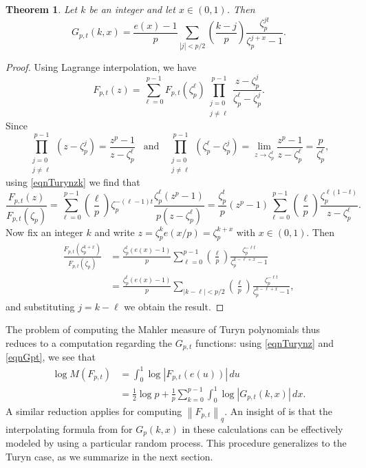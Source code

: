 \documentclass[reqno]{amsart}
\newtheorem{theorem}{Theorem}[section]
\numberwithin{equation}{section}
\numberwithin{table}{section}
\numberwithin{figure}{section}
\newcommand{\leg}[2]{\left(\frac{#1}{#2}\right)}
\newcommand{\abs}[1]{\left\lvert#1\right\rvert}
\newcommand{\dbars}[1]{\left\lVert#1\right\rVert}
\begin{document}
\begin{theorem}\label{thmAbsTuryn}
Let $k$ be an integer and let $x\in(0,1)$.
Then
\[
G_{p,t}(k,x) =
\frac{e(x)-1}{p}\sum_{\abs{j}<p/2} \leg{k-j}{p} \frac{\zeta_p^{jt}}{\zeta_p^{j+x}-1}.
\]
\end{theorem}

\begin{proof}
Using Lagrange interpolation, we have
\[
F_{p,t}(z) = \sum_{\ell=0}^{p-1} F_{p,t}(\zeta_p^\ell)
\prod_{\substack{j=0\\j\neq\ell}}^{p-1} \frac{z-\zeta_p^j}{\zeta_p^\ell-\zeta_p^j}.
\]
Since
\[
\prod_{\substack{j=0\\j\neq\ell}}^{p-1} (z-\zeta_p^j) = \frac{z^p-1}{z-\zeta_p^\ell}
\;\;\; \textrm{and} \;\;\;
\prod_{\substack{j=0\\j\neq\ell}}^{p-1} (\zeta_p^\ell-\zeta_p^j) =
\lim_{z\to\zeta_p^\ell} \frac{z^p-1}{z-\zeta_p^\ell} = \frac{p}{\zeta_p^{\ell}},
\]
using \eqref{eqnTurynzk} we find that
\[
\frac{F_{p,t}(z)}{F_{p,t}(\zeta_p)}
= \sum_{\ell=0}^{p-1} \leg{\ell}{p}\zeta_p^{-(\ell-1)t} \frac{\zeta_p^\ell(z^p-1)}{p(z-\zeta_p^\ell)}
= \frac{\zeta_p^t}{p}(z^p-1) \sum_{\ell=0}^{p-1} \leg{\ell}{p} \frac{\zeta_p^{\ell(1-t)}}{z-\zeta_p^\ell}.
\]
Now fix an integer $k$ and write $z=\zeta_p^k e(x/p)=\zeta_p^{k+x}$ with $x\in(0,1)$.
Then
\begin{align*}
\frac{F_{p,t}(\zeta_p^{k+x})}{F_{p,t}(\zeta_p)} &=
\frac{\zeta_p^t (e(x)-1)}{p}
\sum_{\ell=0}^{p-1} \leg{\ell}{p} \frac{\zeta_p^{-\ell t}}{\zeta_p^{k-\ell+x}-1}\\
&=
\frac{\zeta_p^t (e(x)-1)}{p} \sum_{\abs{k-\ell}<p/2} \leg{\ell}{p} \frac{\zeta_p^{-\ell t}}{\zeta_p^{k-\ell+x}-1},
\end{align*}
and substituting $j=k-\ell$ we obtain the result.
\end{proof}

The problem of computing the Mahler measure of Turyn polynomials thus reduces to a computation regarding the $G_{p,t}$ functions: using \eqref{eqnTurynz} and \eqref{eqnGpt}, we see that
\begin{equation}\label{eqnTurynToInterp}
\begin{split}
\log M(F_{p,t}) &= \int_0^1 \log\abs{F_{p,t}(e(u))}\,du\\
&= \frac{1}{2}\log p + \frac{1}{p} \sum_{k=0}^{p-1} \int_0^1 \log\abs{G_{p,t}(k, x)}\,dx.
\end{split}
\end{equation}
A similar reduction applies for computing $\dbars{F_{p,t}}_q$.
An insight of \cite{KLM23} is that the interpolating formula from \cite{CGPS00} for $G_p(k,x)$ in these calculations can be effectively modeled by using a particular random process.
This procedure generalizes to the Turyn case, as we summarize in the next section.
\end{document}
